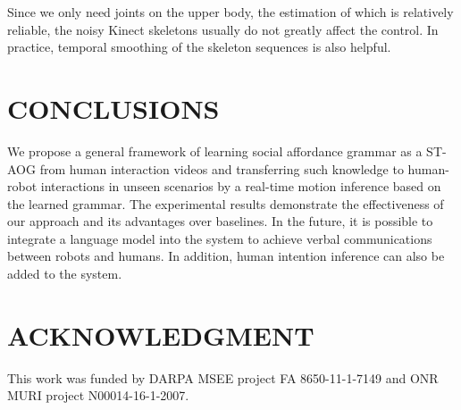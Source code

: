 \documentclass[letterpaper, 10 pt, conference]{ieeeconf}  %
\begin{document}
Since we only need joints on the upper body, the estimation of which is relatively reliable, the noisy Kinect skeletons usually do not greatly affect the control. In practice, temporal smoothing of the skeleton sequences is also helpful.




\section{CONCLUSIONS}
We propose a general framework of learning social affordance grammar as a ST-AOG from human interaction videos and transferring such knowledge to human-robot interactions in unseen scenarios by a real-time motion inference based on the learned grammar. The experimental results demonstrate the effectiveness of our approach and its advantages over baselines. In the future, it is possible to integrate a language model into the system to achieve verbal communications between robots and humans. In addition, human intention inference can also be added to the system.



\section*{ACKNOWLEDGMENT}
This work was funded by DARPA MSEE project FA 8650-11-1-7149 and ONR MURI project N00014-16-1-2007.







\end{document}
